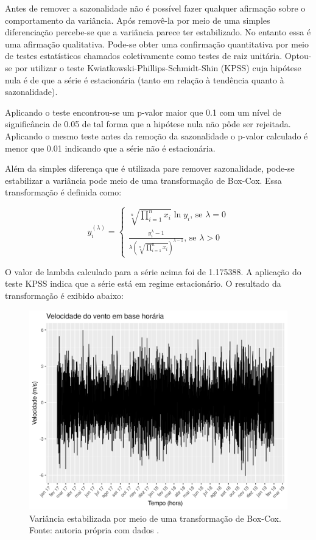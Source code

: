 \documentclass[
	12pt,				%
	openright,			%
	oneside,			%
	a4paper,			%
	english,			%
	french,				%
	spanish,			%
	brazil				%
	]{abntex2}
\begin{document}
Antes de remover a sazonalidade não é possível fazer qualquer afirmação sobre o comportamento da variância. Após removê-la por meio de uma simples diferenciação percebe-se que a variância parece ter estabilizado. No entanto essa é uma afirmação qualitativa. Pode-se obter uma confirmação quantitativa por meio de testes estatísticos chamados coletivamente como testes de raiz unitária. Optou-se por utilizar o teste Kwiatkowski-Phillips-Schmidt-Shin (KPSS) cuja hipótese nula é de que a série é estacionária (tanto em relação à tendência quanto à sazonalidade).

Aplicando o teste encontrou-se um p-valor maior que 0.1 com um nível de significância de 0.05 de tal forma que a hipótese nula não pôde ser rejeitada. Aplicando o mesmo teste antes da remoção da sazonalidade o p-valor calculado é menor que 0.01 indicando que a série não é estacionária. 

Além da simples diferença que é utilizada pare remover sazonalidade, pode-se estabilizar a variância pode meio de uma transformação de Box-Cox. Essa transformação é definida como:

\begin{equation}
y_i^{(\lambda)} = 
	\begin{cases}
		\sqrt[n]{\prod\limits_{i=1}^{n}x_i}\ln y_i\text{, se $\lambda = 0$}
		\\
		\frac{y_i^\lambda-1}{\lambda\left(\sqrt[n]{\prod\limits_{i=1}^{n}x_i}\right)^{\lambda-1}} \text{, se $\lambda > 0$}
	\end{cases}	
\end{equation}
 
O valor de lambda calculado para a série acima foi de 1.175388. A aplicação do teste KPSS indica que a série está em regime estacionário. O resultado da transformação é exibido abaixo:

\begin{figure}[h]
    \centering
	\includegraphics[width=\textwidth]{entire_series_hourly_basis_seasonless_boxcox.png}
	\caption{Variância estabilizada por meio de uma transformação de Box-Cox. Fonte: autoria própria com dados \cite{era5}.}
\end{figure}
\FloatBarrier 
\end{document}
